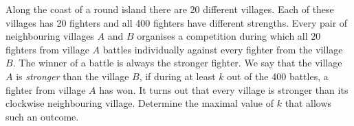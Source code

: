 Along the coast of a round island there are 20 different villages.
Each of these villages has 20 fighters and all 400 fighters have different strengths.
Every pair of neighbouring villages $A$ and $B$ organises a competition during
which all $20$ fighters from village $A$ battles individually against every fighter from the village $B$.
The winner of a battle is always the stronger fighter.
We say that the village $A$ is \emph{stronger} than the village $B$,
if during at least $k$ out of the 400 battles, a fighter from village $A$ has won.
It turns out that every village is stronger than its clockwise neighbouring village.
Determine the maximal value of $k$ that allows such an outcome.
